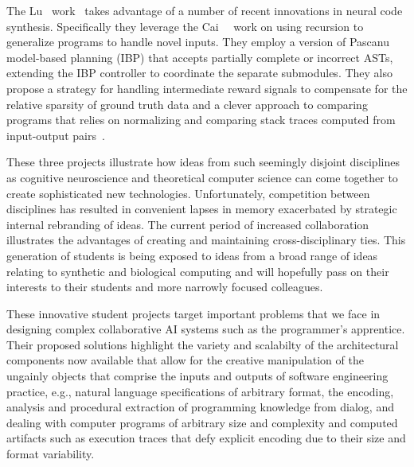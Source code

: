 The Lu~\etal{} work~\cite{CS379C_Final_Project_Luetal-18} takes advantage of a number of recent innovations in neural code synthesis. Specifically they leverage the Cai~\etal{}~\cite{CaietalICLR-17} work on using recursion to generalize programs to handle novel inputs. They employ a version of Pascanu~\etal{}~\cite{PascanuetalCoRR-17} model-based planning (IBP) that accepts partially complete or incorrect ASTs, extending the IBP controller to coordinate the separate submodules. They also propose a strategy for handling intermediate reward signals to compensate for the relative sparsity of ground truth data and a clever approach to comparing programs that relies on normalizing and comparing stack traces computed from input-output pairs~\cite{BrodieetalICAC-05,GuptaetalPATENT-06,SmithandWatermanJMB-81}. 

These three projects illustrate how ideas from such seemingly disjoint disciplines as cognitive neuroscience and theoretical computer science can come together to create sophisticated new technologies. Unfortunately, competition between disciplines has resulted in convenient lapses in memory exacerbated by strategic internal rebranding of ideas. The current period of increased collaboration illustrates the advantages of creating and maintaining cross-disciplinary ties. This generation of students is being exposed to ideas from a broad range of ideas relating to synthetic and biological computing and will hopefully pass on their interests to their students and more narrowly focused colleagues.


These innovative student projects target important problems that we face in designing complex collaborative AI systems such as the programmer's apprentice. Their proposed solutions highlight the variety and scalabilty of the architectural components now available that allow for the creative manipulation of the ungainly objects that comprise the inputs and outputs of software engineering practice, e.g., natural language specifications of arbitrary format, the encoding, analysis and procedural extraction of programming knowledge from dialog, and dealing with computer programs of arbitrary size and complexity and computed artifacts such as execution traces that defy explicit encoding due to their size and format variability.


